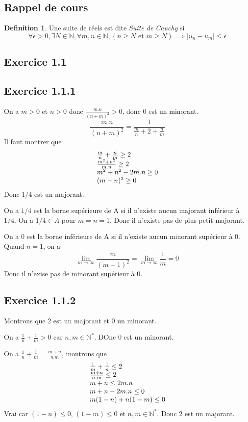 \documentclass[]{book}
\theoremstyle{definition}
\newtheorem{defn}{Definition}
\newcommand{\bb}[1]{\mathbb{#1}}
\newcommand{\N}{\bb{N}}
\begin{document}
\subsection*{Rappel de cours}
\begin{defn}
Une suite de r\'eels est dite \emph{Suite de Cauchy} si
$$
\forall \epsilon > 0, \exists N \in \N, \forall m,n \in \N, (n \geq N \text{ et } m \geq N) \implies |u_n - u_m| \leq \epsilon 
$$
\end{defn}



\newpage
\subsection*{Exercice 1.1}
\subsection*{Exercice 1.1.1}
On a $m > 0$ et $n >0$ donc $\frac{m.n}{(n+m)^2} > 0$, donc 0 est un minorant. 
$$
\frac{m.n}{(n+m)^2} = \frac{1}{\frac{m}{n}+2+\frac{n}{m}}
$$
Il faut montrer que 
$$
\begin{array}{l l}
\frac{m}{n}+\frac{n}{m} \geq 2 \\
\frac{m^2+n^2}{m.n} \geq 2 \\
m^2+n^2-2m.n \geq 0 \\
(m-n)^2 \geq 0 \\
\end{array}
$$
Donc $1/4$ est un majorant.

On a $1/4$ est la borne sup\'erieure de A si il n'existe aucun majorant inf\'erieur \`a $1/4$. On a $1/4 \in A$ pour $m=n=1$. Donc il n'existe pas de plus petit majorant.

On a 0 est la borne inf\'erieure de A si il n'existe aucun minorant sup\'erieur \`a $0$. Quand $n=1$, on a 
$$\lim_{m \to \infty}\frac{m}{(m+1)^2} = \lim_{m \to \infty}\frac{1}{m} = 0$$
Donc il n'exise pas de minorant sup\'erieur \`a 0.

\subsection*{Exercice 1.1.2}
Montrons que 2 est un majorant et 0 un minorant.

On a $\frac{1}{n}+\frac{1}{m}>0$ car $n,m \in \N^{*}$. DOnc 0 est un minorant.

On a $\frac{1}{n}+\frac{1}{m} = \frac{m+n}{n.m}$, montrons que 
$$
\begin{array}{l l}
\frac{1}{m} +  \frac{1}{n} \leq 2 \\
\frac{m+n}{n.m} \leq 2 \\
m+n \leq 2m.n \\
m+n-2m.n \leq 0 \\
m(1-n)+n(1-m) \leq 0 \\
\end{array}
$$
Vrai car $(1-n) \leq 0$, $(1-m) \leq 0$ et $n,m \in \N^{*}$. Donc $2$ est un majorant.
\end{document}
